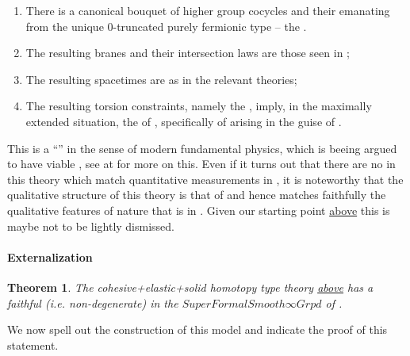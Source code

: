 \documentclass[12pt,titlepage]{article}
\theoremstyle{plain}
\newtheorem{theorem}{Theorem}
\theoremstyle{definition}
\theoremstyle{remark}
\begin{document}
\begin{enumerate}%
\item There is a canonical bouquet of higher group cocycles and their  emanating from the unique 0-truncated purely fermionic type -- the .


\item The resulting branes and their intersection laws are those seen in ;


\item The resulting spacetimes are  as in the relevant  theories;


\item The resulting torsion constraints, namely the , imply, in the maximally extended situation, the   of , specifically of  arising in the guise of .



\end{enumerate}
This is a ``'' in the sense of modern fundamental physics, which is beeing argued to have viable , see at  for more on this. Even if it turns out that there are no  in this theory which match quantitative measurements in , it is noteworthy that the qualitative structure of this theory is that of  and hence matches faithfully the qualitative features of nature that is in . Given our starting point \hyperlink{TheGround}{above} this is maybe not to be lightly dismissed.

\hypertarget{Externalization}{}\paragraph*{{Externalization}}\label{Externalization}

\begin{theorem}
\label{SupergeometryIsModel}\hypertarget{SupergeometryIsModel}{}
The cohesive+elastic+solid homotopy type theory \hyperlink{ObjectiveLogic}{above} has a faithful (i.e. non-degenerate)  in the  $SuperFormalSmooth\infty Grpd$ of .

\end{theorem}
We now spell out the construction of this model and indicate the proof of this statement.
\end{document}
